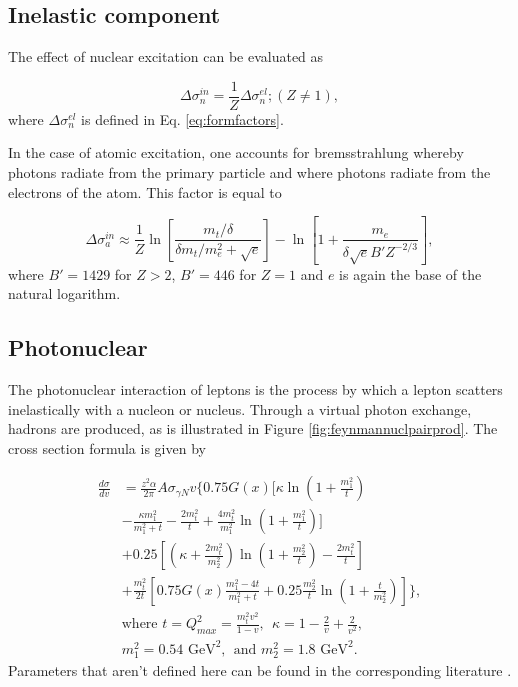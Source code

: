 \subsection{Inelastic component}

The effect of nuclear excitation can be evaluated as

\begin{equation}
\Delta \sigma^{in}_n = \frac{1}{Z} \Delta \sigma^{el}_n; (Z \neq 1),
 \end{equation}
where $\Delta \sigma^{el}_n$ is defined in Eq. \ref{eq:formfactors}.

In the case of atomic excitation, one accounts for bremsstrahlung whereby photons radiate from the primary particle and where photons radiate from the electrons of the atom. This factor is equal to

\begin{equation}
\Delta \sigma^{in}_a \approx \frac{1}{Z} \ln \left[ \frac{m_t/\delta}{\delta m_t/m_e^2 + \sqrt{e}} \right] - \ln\left[1+ \frac{m_e}{\delta \sqrt{e} B' Z^{-2/3}} \right],
\end{equation}
where $B'=1429$ for $Z > 2$, $B' = 446$ for $Z=1$ and $e$ is again the base of the natural logarithm.
\subsection{Photonuclear}
The photonuclear interaction of leptons is the process by which a lepton scatters inelastically with a nucleon or nucleus. Through a virtual photon exchange, hadrons are produced, as is illustrated in Figure \ref{fig:feynmannuclpairprod}. The cross section formula is given by

\begin{equation} 
\begin{split} 
\frac{d\sigma}{dv} &= \frac{z^2 \alpha}{2\pi} A \sigma_{\gamma N} v  \Bigg \lbrace  0.75 G(x) \Bigg [\kappa \ln \left(1+\frac{m_1^2}{t}\right) \\
& -\frac{\kappa m_1^2}{m_1^2 + t} - \frac{2 m_t^2}{t} + \frac{4 m_t^2}{m_1^2} \ln \left(1+ \frac{m_1^2}{t} \right)  \Bigg] \\
& + 0.25 \left[ \left(\kappa + \frac{2m_t^2}{m_2^2} \right) \ln \left(1+\frac{m_2^2}{t} \right) - \frac{2m_t^2}{t}\right]\\
& + \frac{m_t^2}{2t} \left[ 0.75 G(x) \frac{m_1^2 -4t}{m_1^2 +t} +0.25 \frac{m_2^2}{t} \ln \left(1+\frac{t}{m_2^2} \right) \right] \Bigg \rbrace,\\
& \textrm{where \ \ } t = Q_{max}^2 = \frac{m_t^2 v^2}{1-v}, \ \ \kappa = 1-\frac{2}{v} + \frac{2}{v^2}, \\
& m_1^2 = 0.54 \textrm{ GeV}^2, \ \ \textrm{and \ \ \ } m_2^2 = 1.8 \textrm{\ GeV}^2.
\end{split} 
\end{equation}
Parameters that aren't defined here can be found in the corresponding literature \cite{Chirkin:2004hz}.

